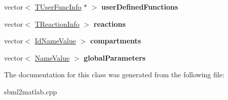\begin{DoxyCompactItemize}
\item 
\hypertarget{class_s_b_m_l_info_a5e4fb5f5dde4a729f1a818dcaadd6d45}{vector$<$ \hyperlink{struct_t_user_func_info}{T\-User\-Func\-Info} $\ast$ $>$ {\bfseries user\-Defined\-Functions}}\label{class_s_b_m_l_info_a5e4fb5f5dde4a729f1a818dcaadd6d45}

\item 
\hypertarget{class_s_b_m_l_info_a62257b843d585fbe8cffac0255b6106a}{vector$<$ \hyperlink{class_t_reaction_info}{T\-Reaction\-Info} $>$ {\bfseries reactions}}\label{class_s_b_m_l_info_a62257b843d585fbe8cffac0255b6106a}

\item 
\hypertarget{class_s_b_m_l_info_ac3cb1edee7f239f888e0f28f1c5d6ede}{vector$<$ \hyperlink{class_id_name_value}{Id\-Name\-Value} $>$ {\bfseries compartments}}\label{class_s_b_m_l_info_ac3cb1edee7f239f888e0f28f1c5d6ede}

\item 
\hypertarget{class_s_b_m_l_info_a7160ebc957cc071e32fc5b3c13505858}{vector$<$ \hyperlink{class_name_value}{Name\-Value} $>$ {\bfseries global\-Parameters}}\label{class_s_b_m_l_info_a7160ebc957cc071e32fc5b3c13505858}

\end{DoxyCompactItemize}


The documentation for this class was generated from the following file\-:\begin{DoxyCompactItemize}
\item 
sbml2matlab.\-cpp\end{DoxyCompactItemize}
